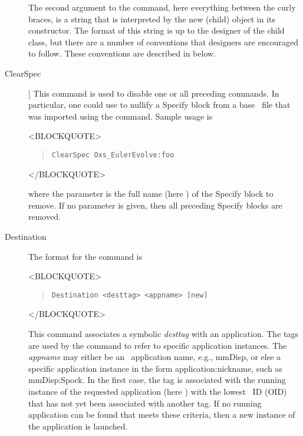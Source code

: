 \begin{description}
The second argument to the  command, here everything between
the curly braces, is a string that is interpreted by the new
 (child) object in its constructor.  The format of this
string is up to the designer of the child class, but there are a number
of conventions that designers are encouraged to follow.  These
conventions are described in 
  below.

\item[ClearSpec\label{html:mif2ClearSpec}]]
This command is used to disable one or all preceding 
commands.  In particular, one could use  to nullify a
Specify block from a base \MIF\ file that was imported using the
 command.  Sample usage is
\begin{rawhtml}<BLOCKQUOTE>\end{rawhtml}
\begin{quote}
\begin{verbatim}
ClearSpec Oxs_EulerEvolve:foo
\end{verbatim}
\end{quote}
\begin{rawhtml}</BLOCKQUOTE>\end{rawhtml}
where the parameter is the full name (here ) of
the Specify block to remove.  If no parameter is given, then all
preceding Specify blocks are removed.

\item[Destination\label{html:destinationCmd}]
The format for the  command is
\begin{rawhtml}<BLOCKQUOTE>\end{rawhtml}
\begin{quote}
\begin{verbatim}
Destination <desttag> <appname> [new]
\end{verbatim}
\end{quote}
\begin{rawhtml}</BLOCKQUOTE>\end{rawhtml}
This command associates a symbolic \textit{desttag} with an application.
The tags are used by the
 command
to refer to specific application instances.  The \textit{appname} may
either be an \OOMMF\ application name, e.g., mmDisp, or else a
specific application instance in the form application:nickname, such
as mmDisp:Spock.  In the first case, the tag is associated with the
running instance of the requested application (here ) with the
lowest \OOMMF\ ID (OID) that has not yet been associated with
another tag.  If no running application can be found that meets
these criteria, then a new instance of the application is launched.


\end{description}
